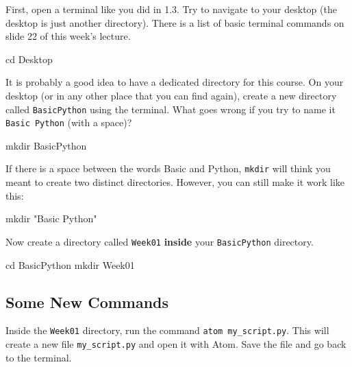 First, open a terminal like you did in 1.3. Try to navigate to your desktop (the desktop is just another directory). There is a list of basic terminal commands on slide 22 of this week's lecture.

\vspace{1em}

\begin{solution}
    \begin{outputcode}
cd Desktop
    \end{outputcode}
\end{solution}

\noindent It is probably a good idea to have a dedicated directory for this course. On your desktop (or in any other place that you can find again), create a new directory called \texttt{BasicPython} using the terminal. What goes wrong if you try to name it \texttt{Basic Python} (with a space)?

\vspace{1em}
\begin{solution}
    \begin{outputcode}
mkdir BasicPython
    \end{outputcode}

    \noindent If there is a space between the words Basic and Python, \texttt{mkdir} will think you meant to create two distinct directories. However, you can still make it work like this:

    \begin{outputcode}
mkdir "Basic Python"
    \end{outputcode}

\end{solution}

\noindent Now create a directory called \texttt{Week01} \textbf{inside} your \texttt{BasicPython} directory.

\vspace{1em}

\begin{solution}
    \begin{outputcode}
cd BasicPython
mkdir Week01
    \end{outputcode}
\end{solution}

\subsection{Some New Commands}

Inside the \texttt{Week01} directory, run the command \texttt{atom my\_script.py}. This will create a new file \texttt{my\_script.py} and open it with Atom. Save the file and go back to the terminal.

